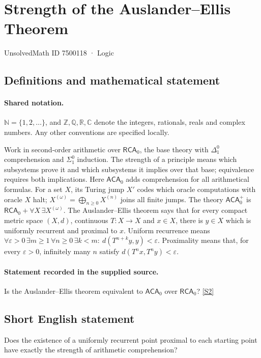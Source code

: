 \documentclass[11pt]{article}
\newcommand{\sref}[2]{\hyperlink{source:#1:#2}{[S#2]}}
\begin{document}
\setcounter{section}{7500117}
\section{Strength of the Auslander–Ellis Theorem}\label{7500118}
{\small\sffamily UnsolvedMath ID 7500118 · Logic}
\subsection{Definitions and mathematical statement}

\paragraph{Shared notation.}$\mathbb N=\{1,2,\ldots\}$, and $\mathbb Z,\mathbb Q,\mathbb R,\mathbb C$ denote the integers, rationals, reals and complex numbers. Any other conventions are specified locally.


Work in second-order arithmetic over $\mathsf{RCA}_0$, the base theory with $\Delta^0_1$ comprehension and $\Sigma^0_1$ induction. The strength of a principle means which subsystems prove it and which subsystems it implies over that base; equivalence requires both implications.  Here $\mathsf{ACA}_0$ adds comprehension for all arithmetical formulas. For a set $X$, its Turing jump $X'$ codes which oracle computations with oracle $X$ halt; $X^{(\omega)}=\bigoplus_{n\geq0}X^{(n)}$ joins all finite jumps. The theory $\mathsf{ACA}_0^+$ is $\mathsf{RCA}_0+\forall X\,\exists X^{(\omega)}$. The Auslander--Ellis theorem says that for every compact metric space $(X,d)$, continuous $T:X\to X$ and $x\in X$, there is $y\in X$ which is uniformly recurrent and proximal to $x$. Uniform recurrence means $\forall\varepsilon>0\,\exists m\geq1\,\forall n\geq0\,\exists k<m:\ d(T^{n+k}y,y)<\varepsilon$. Proximality means that, for every $\varepsilon>0$, infinitely many $n$ satisfy $d(T^nx,T^ny)<\varepsilon$.
\paragraph{Statement recorded in the supplied source.}
Is the Auslander--Ellis theorem equivalent to $\mathsf{ACA}_0$ over $\mathsf{RCA}_0$? \sref{7500118}{2}
\subsection{Short English statement}
Does the existence of a uniformly recurrent point proximal to each starting point have exactly the strength of arithmetic comprehension?
\end{document}
